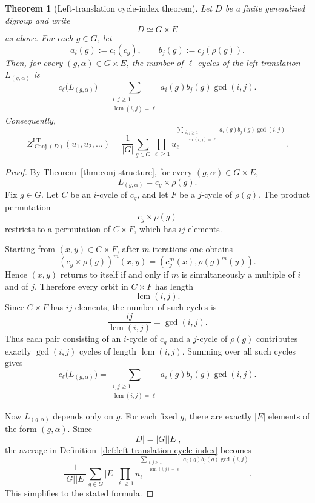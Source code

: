 \documentclass[11pt]{article}
\theoremstyle{plain}
\newtheorem{theorem}{Theorem}[section]
\theoremstyle{definition}
\theoremstyle{remark}
\DeclareMathOperator{\Conj}{Conj}
\begin{document}
	\begin{theorem}[Left-translation cycle-index theorem]\label{thm:cycle-index}
		Let \(D\) be a finite generalized digroup and write
		\[
		D\simeq G\times E
		\]
		as above. For each \(g\in G\), let
		\[
		a_i(g):=c_i(c_g),
		\qquad
		b_j(g):=c_j(\rho(g)).
		\]
		Then, for every \((g,\alpha)\in G\times E\), the number of
		\(\ell\)-cycles of the left translation \(L_{(g,\alpha)}\) is
		\[
		c_\ell\bigl(L_{(g,\alpha)}\bigr)
		=
		\sum_{\substack{i,j\geq 1\\ \operatorname{lcm}(i,j)=\ell}}
		a_i(g)b_j(g)\gcd(i,j).
		\]
		Consequently,
		\[
		Z_{\Conj(D)}^{\mathrm{LT}}(u_1,u_2,\ldots)
		=
		\frac{1}{|G|}
		\sum_{g\in G}
		\prod_{\ell\geq 1}
		u_\ell^{
			\sum_{\substack{i,j\geq 1\\ \operatorname{lcm}(i,j)=\ell}}
			a_i(g)b_j(g)\gcd(i,j)
		}.
		\]
	\end{theorem}
	
	\begin{proof}
		By Theorem~\ref{thm:conj-structure}, for every \((g,\alpha)\in G\times E\),
		\[
		L_{(g,\alpha)}=c_g\times\rho(g).
		\]
		Fix \(g\in G\). Let \(C\) be an \(i\)-cycle of \(c_g\), and let \(F\) be a
		\(j\)-cycle of \(\rho(g)\). The product permutation
		\[
		c_g\times\rho(g)
		\]
		restricts to a permutation of \(C\times F\), which has \(ij\) elements.
		
		Starting from \((x,y)\in C\times F\), after \(m\) iterations one obtains
		\[
		(c_g\times\rho(g))^m(x,y)
		=
		(c_g^m(x),\rho(g)^m(y)).
		\]
		Hence \((x,y)\) returns to itself if and only if \(m\) is simultaneously a
		multiple of \(i\) and of \(j\). Therefore every orbit in \(C\times F\) has
		length
		\[
		\operatorname{lcm}(i,j).
		\]
		Since \(C\times F\) has \(ij\) elements, the number of such cycles is
		\[
		\frac{ij}{\operatorname{lcm}(i,j)}
		=
		\gcd(i,j).
		\]
		Thus each pair consisting of an \(i\)-cycle of \(c_g\) and a \(j\)-cycle of
		\(\rho(g)\) contributes exactly \(\gcd(i,j)\) cycles of length
		\(\operatorname{lcm}(i,j)\). Summing over all such cycles gives
		\[
		c_\ell\bigl(L_{(g,\alpha)}\bigr)
		=
		\sum_{\substack{i,j\geq 1\\ \operatorname{lcm}(i,j)=\ell}}
		a_i(g)b_j(g)\gcd(i,j).
		\]
		
		Now \(L_{(g,\alpha)}\) depends only on \(g\). For each fixed \(g\), there are
		exactly \(|E|\) elements of the form \((g,\alpha)\). Since
		\[
		|D|=|G||E|,
		\]
		the average in Definition~\ref{def:left-translation-cycle-index} becomes
		\[
		\frac{1}{|G||E|}
		\sum_{g\in G}
		|E|
		\prod_{\ell\geq 1}
		u_\ell^{
			\sum_{\substack{i,j\geq 1\\ \operatorname{lcm}(i,j)=\ell}}
			a_i(g)b_j(g)\gcd(i,j)
		}.
		\]
		This simplifies to the stated formula.
	\end{proof}
	
\end{document}

